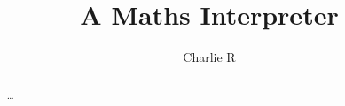 \documentclass[titlepage]{report}
\title{\textbf{\huge{A Maths Interpreter}}\\ \ccbyncsa}
\author{Charlie R}
\begin{document}
    \maketitle


    \tableofcontents

    \begin{abstract}
        \ldots
    \end{abstract}

    \newpage{}\setcounter{page}{1}

    
    
    
    
\end{document}

